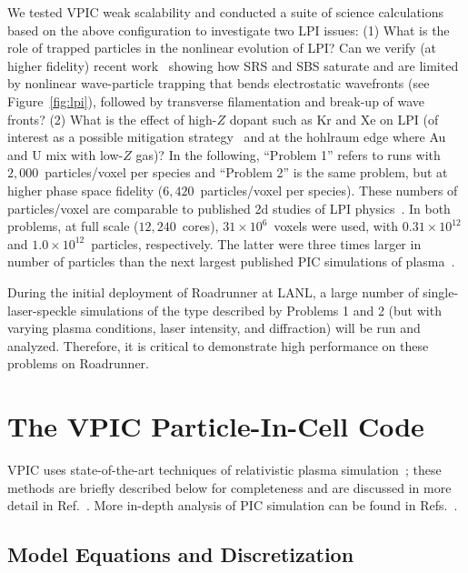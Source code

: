 \documentclass[journal,twoside]{IEEEtran}
\newcommand{\fig}[1]{Figure~\ref{fig:#1}}
\begin{document}
We tested VPIC weak scalability and conducted a suite of science
calculations~\cite{AAC_Conference_Paper} based on the above
configuration to investigate two LPI issues: (1) What is the role
of trapped particles in the nonlinear evolution of LPI?  Can we verify
(at higher fidelity) recent
work~\cite{Yin_et_al_PRL_2007_SRS,Yin_et_al_Phys_Plasmas_2007_SRS}
showing how SRS and SBS saturate and are limited by nonlinear
wave-particle trapping that bends electrostatic wavefronts (see
\fig{lpi}), followed by transverse filamentation and break-up
of wave fronts?  (2) What is the effect of high-$Z$ dopant such as Kr
and Xe on LPI (of interest as a possible mitigation
strategy~\cite{Lushnikov_PPCF_2006} and at the hohlraum edge where Au
and U mix with low-$Z$ gas)?  In the following, ``Problem 1'' refers
to runs with $2,000$~particles/voxel per species and ``Problem 2'' is
the same problem, but at higher phase space fidelity
($6,420$~particles/voxel per species).  These numbers of
particles/voxel are comparable to published 2d studies of LPI
physics~\cite{Yin_et_al_PRL_2007_SRS,Yin_et_al_Phys_Plasmas_2007_SRS}.
In both problems, at full scale ($12,240$~cores), $31 \times
10^6$~voxels were used, with $0.31 \times 10^{12}$ and $1.0 \times
10^{12}$~particles, respectively.  The latter were three times larger
in number of particles than the next largest published PIC simulations
of plasma~\cite{Yin_et_al_PRL_2007_reconnection}.

During the initial deployment of Roadrunner at LANL, a large number of
single-laser-speckle simulations of the type described by Problems 1
and 2 (but with varying plasma conditions, laser intensity, and
diffraction) will be run and analyzed.  Therefore, it is critical to
demonstrate high performance on these problems on Roadrunner.

\section{The VPIC Particle-In-Cell Code}

VPIC uses state-of-the-art techniques of relativistic plasma
simulation~\cite{Blahovec_et_al_2000,Eastwood_et_al_1995,
Jones_et_al_1996,Kwan_Snell_1985,Nieter_Cary_2004,
Verboncoeur_et_al_1995}; these methods are briefly described below for
completeness and are discussed in more detail in
Ref.~\cite{Bowers_et_al_Phys_Plasmas_2007}.  More in-depth analysis of
PIC simulation can be found in
Refs.~\cite{Birdsall_Langdon_1985,Hockney_Eastwood_1988}.

\subsection{Model Equations and Discretization}
\end{document}
